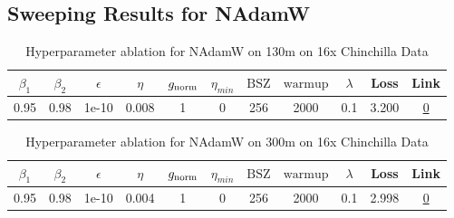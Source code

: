 \subsection{Sweeping Results for NAdamW}%
\begin{table}[H]
\centering
\caption{Hyperparameter ablation for NAdamW on 130m on 16x Chinchilla Data}
\label{tab:ablation_nadamw_130m_on_16x_chinchilla_data}
\begin{tabular}{ccccccccccc}
\toprule
$\beta_1$ & $\beta_2$ & $\epsilon$ & $\eta$ & $g_{\mathrm{norm}}$ & $\eta_{min}$ & $\mathrm{BSZ}$ & $\mathrm{warmup}$ & $\lambda$ & Loss & Link \\
\midrule
0.95 & 0.98 & 1e-10 & 0.008 & 1 & 0 & 256 & 2000 & 0.1 & 3.200 & \href{https://wandb.ai/marin-community/optimizer-scaling/runs/sweep-130m-42B-nadamw6383f8lr0.008-wd0.1-minlr0-warmup2000-b10.9-d7e8d3}{0} \\
\midrule
\bottomrule
\end{tabular}
\end{table}

\begin{table}[H]
\centering
\caption{Hyperparameter ablation for NAdamW on 300m on 16x Chinchilla Data}
\label{tab:ablation_nadamw_300m_on_16x_chinchilla_data}
\begin{tabular}{ccccccccccc}
\toprule
$\beta_1$ & $\beta_2$ & $\epsilon$ & $\eta$ & $g_{\mathrm{norm}}$ & $\eta_{min}$ & $\mathrm{BSZ}$ & $\mathrm{warmup}$ & $\lambda$ & Loss & Link \\
\midrule
0.95 & 0.98 & 1e-10 & 0.004 & 1 & 0 & 256 & 2000 & 0.1 & 2.998 & \href{https://wandb.ai/marin-community/optimizer-scaling/runs/sweep-300m-96B-nadamw860e52lr0.004-wd0.1-minlr0-warmup2000-b10.9-8d9fe1}{0} \\
\midrule
\bottomrule
\end{tabular}
\end{table}

